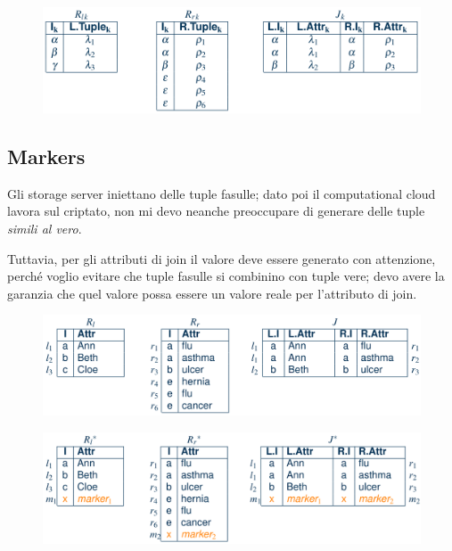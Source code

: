 \documentclass{report}
\begin{document}
\begin{figure}[H]
    \centering
    \includegraphics[width=1\linewidth]{images/otf2.png}
\end{figure}



\subsection{Markers}

Gli storage server iniettano delle tuple fasulle; dato poi il computational cloud lavora sul criptato, non 
mi devo neanche preoccupare di generare delle tuple \textit{simili al vero}.

\noindent Tuttavia, per gli attributi di join il valore deve essere generato con attenzione, perché 
voglio evitare che tuple fasulle si combinino con tuple vere; devo avere la garanzia che 
quel valore possa essere un valore reale per l'attributo di join.

\begin{figure}[H]
    \centering
    \includegraphics[width=1\linewidth]{images/marker1.png}
\end{figure}

\begin{figure}[H]
    \centering
    \includegraphics[width=1\linewidth]{images/marker2.png}
\end{figure}
\end{document}
